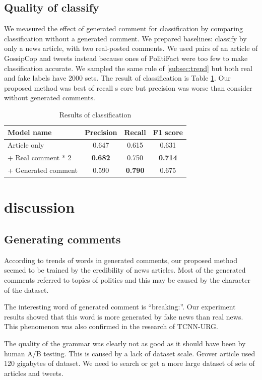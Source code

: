 \documentclass[conference]{IEEEtran}
\begin{document}
\subsection{Quality of classify}
We measured the effect of generated comment for classification by comparing classification without a generated comment.
We prepared baselines: classify by only a news article, with two real-posted comments.
We used pairs of an article of GossipCop and tweets instead because ones of PolitiFact were too few to make classification accurate.
We sampled the same rule of \ref{subsec:trend} but both real and fake labels have 2000 sets.
The result of classification is Table \ref{tbl:classify_results}.
Our proposed method was best of recall s core but precision was worse than consider without generated comments.
\begin{table}[!t]
    \renewcommand{\arraystretch}{1.3}
    \caption{Results of classification}
    \label{tbl:classify_results}
    \centering
    \begin{tabular}{lccc}
    \hline
    Model name           & Precision & Recall & F1 score \\ \hline
    Article only         & 0.647     & 0.615  & 0.631    \\
     + Real comment * 2  & \textbf{0.682}     & 0.750  & \textbf{0.714}    \\
     + Generated comment & 0.590     & \textbf{0.790}  & 0.675    \\ \hline
    \end{tabular}
    \end{table}
\section{discussion}
\subsection{Generating comments}
According to trends of words in generated comments, our proposed method seemed to be trained by the credibility of news articles.
Most of the generated comments referred to topics of politics and this may be caused by the character of the dataset.

The interesting word of generated comment is ``breaking:''.
Our experiment results showed that this word is more generated by fake news than real news.
This phenomenon was also confirmed in the research of TCNN-URG\cite{ijcai2018-533}.

The quality of the grammar was clearly not as good as it should have been by human A/B testing.
This is caused by a lack of dataset scale. 
Grover article used 120 gigabytes of dataset\cite{NIPS2019_9106}.
We need to search or get a more large dataset of sets of articles and tweets.
\end{document}
